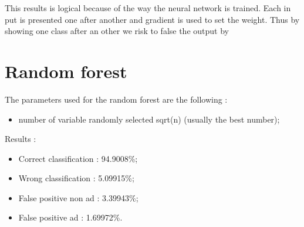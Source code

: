   This results is logical because of the way the neural network is trained. Each in put is presented one after another and gradient is used to set the weight. Thus by showing one class after an other we risk to false the output by
\section{Random forest}
The parameters used for the random forest are the following :
  \begin{itemize}
    \item number of variable randomly selected sqrt(n) (usually the best number);
  \end{itemize}
Results :
\begin{itemize}
  \item Correct classification : 94.9008\%;
  \item Wrong classification : 5.09915\%;
  \item False positive non ad : 3.39943\%;
  \item False positive ad : 1.69972\%.
\end{itemize}
